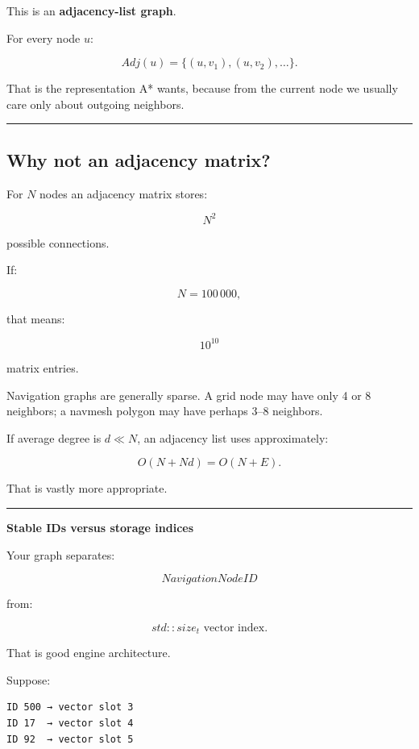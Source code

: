 This is an \textbf{adjacency-list graph}.

For every node \(u\):

\[
Adj(u)
=
\{
(u,v_1),
(u,v_2),
\dots
\}.
\]

That is the representation A* wants, because from the current node we usually care only about outgoing neighbors.

\begin{center}\rule{0.5\linewidth}{0.5pt}\end{center}

\subsection{Why not an adjacency matrix?}\label{06-engine-ii-ch030-why-not-an-adjacency-matrix}

For \(N\) nodes an adjacency matrix stores:

\[
N^2
\]

possible connections.

If:

\[
N=100\,000,
\]

that means:

\[
10^{10}
\]

matrix entries.

Navigation graphs are generally sparse. A grid node may have only 4 or 8 neighbors; a navmesh polygon may have perhaps 3--8 neighbors.

If average degree is \(d\ll N\), an adjacency list uses approximately:

\[
O(N+Nd)
=
O(N+E).
\]

That is vastly more appropriate.

\begin{center}\rule{0.5\linewidth}{0.5pt}\end{center}

\textbf{Stable IDs versus storage indices}

Your graph separates:

\[
NavigationNodeID
\]

from:

\[
std::size_t\text{ vector index}.
\]

That is good engine architecture.

Suppose:

\begin{verbatim}
ID 500 → vector slot 3
ID 17  → vector slot 4
ID 92  → vector slot 5
\end{verbatim}

